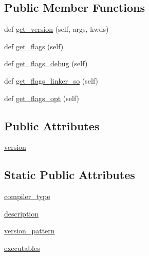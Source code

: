 \subsection*{Public Member Functions}
\begin{DoxyCompactItemize}
\item 
def \hyperlink{classnumpy_1_1distutils_1_1fcompiler_1_1ibm_1_1IBMFCompiler_ab960dd2c81b6d9fefb1ce4f7fc320ce1}{get\+\_\+version} (self, args, kwds)
\item 
def \hyperlink{classnumpy_1_1distutils_1_1fcompiler_1_1ibm_1_1IBMFCompiler_a564160dce4f09963c3da40247a54ee91}{get\+\_\+flags} (self)
\item 
def \hyperlink{classnumpy_1_1distutils_1_1fcompiler_1_1ibm_1_1IBMFCompiler_a1d0dae001818b1e961b152eae36b52bb}{get\+\_\+flags\+\_\+debug} (self)
\item 
def \hyperlink{classnumpy_1_1distutils_1_1fcompiler_1_1ibm_1_1IBMFCompiler_aa2382717f5a96d1cd58fac3d8937d41b}{get\+\_\+flags\+\_\+linker\+\_\+so} (self)
\item 
def \hyperlink{classnumpy_1_1distutils_1_1fcompiler_1_1ibm_1_1IBMFCompiler_a268b3719ccbe951dc41200646f9a7b08}{get\+\_\+flags\+\_\+opt} (self)
\end{DoxyCompactItemize}
\subsection*{Public Attributes}
\begin{DoxyCompactItemize}
\item 
\hyperlink{classnumpy_1_1distutils_1_1fcompiler_1_1ibm_1_1IBMFCompiler_aee4f59a1f12213cd46088ba2c7a1f21a}{version}
\end{DoxyCompactItemize}
\subsection*{Static Public Attributes}
\begin{DoxyCompactItemize}
\item 
\hyperlink{classnumpy_1_1distutils_1_1fcompiler_1_1ibm_1_1IBMFCompiler_aa645e64dd6dc99b3e07bcee32ae9d40f}{compiler\+\_\+type}
\item 
\hyperlink{classnumpy_1_1distutils_1_1fcompiler_1_1ibm_1_1IBMFCompiler_a49536af2f8a9516fbbf631c0e0697ad4}{description}
\item 
\hyperlink{classnumpy_1_1distutils_1_1fcompiler_1_1ibm_1_1IBMFCompiler_a0f45370273b20620ef76c35426e49a46}{version\+\_\+pattern}
\item 
\hyperlink{classnumpy_1_1distutils_1_1fcompiler_1_1ibm_1_1IBMFCompiler_a71313d92ed8eefd522726ca6cdd2ba2b}{executables}
\end{DoxyCompactItemize}


